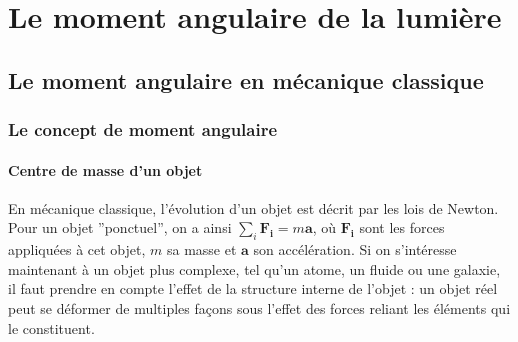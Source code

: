 \chapter{Le moment angulaire de la lumière}
\label{CH:OAM}

\section{Le moment angulaire en mécanique classique}
\subsection{Le concept de moment angulaire}
\subsubsection{Centre de masse d'un objet}

En mécanique classique, l'évolution d'un objet est décrit par les lois de Newton. Pour un objet ''ponctuel'', on a ainsi $\sum_i{\bm{F_i}}=m\bm{a}$, où $\bm{F_i}$ sont les forces appliquées à cet objet, $m$ sa masse et $\bm{a}$ son accélération. Si on s'intéresse maintenant à un objet plus complexe, tel qu'un atome, un fluide ou une galaxie, il faut prendre en compte l'effet de la structure interne de l'objet : un objet réel peut se déformer de multiples façons sous l'effet des forces reliant les éléments qui le constituent.

